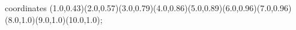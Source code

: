 					coordinates { (1.0,0.43)(2.0,0.57)(3.0,0.79)(4.0,0.86)(5.0,0.89)(6.0,0.96)(7.0,0.96)(8.0,1.0)(9.0,1.0)(10.0,1.0)};